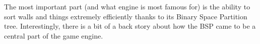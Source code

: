 \par
The most important part (and what \doom engine is most famous for) is the ability to sort walls and things extremely efficiently thanks to its Binary Space Partition tree. Interestingly, there is a bit of a back story about how the BSP came to be a central part of the game engine.\\
\par
\pagebreak


